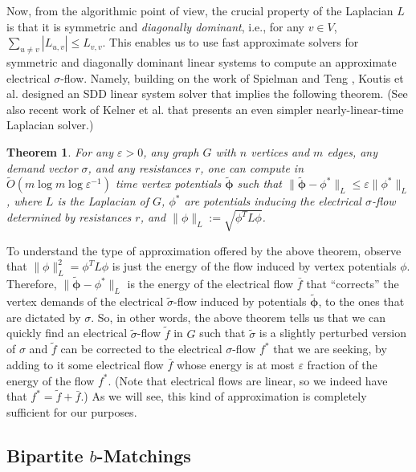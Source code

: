 \documentclass[11pt, letterpaper]{article}
\newtheorem{theorem}{Theorem}[section]
\newcommand{\tO}[1]{\widetilde{O}(#1)}
\newcommand{\eps}{\varepsilon}
\newcommand{\vphi}{\boldsymbol{\mathit{\phi}}}
\newcommand{\vsigma}{\boldsymbol{\mathit{\sigma}}}
\newcommand{\tvsigma}{\boldsymbol{\mathit{\tilde{\sigma}}}}
\newcommand{\tvphi}{\boldsymbol{\tilde{\phi}}}
\newcommand{\bb}{\boldsymbol{\mathit{b}}}
\newcommand{\ff}{\boldsymbol{\mathit{f}}}
\newcommand{\tff}{\boldsymbol{\mathit{\tilde{f}}}}
\newcommand{\off}{\boldsymbol{\mathit{\bar{f}}}}
\newcommand{\rr}{\boldsymbol{\mathit{r}}}
\newcommand{\LL}{\boldsymbol{\mathit{L}}}
\begin{document}
Now, from the algorithmic point of view, the crucial property of the Laplacian $\LL$ is that it is symmetric and {\em diagonally dominant}, i.e., for any $v\in V$, $\sum_{u\neq v} |L_{u,v}| \leq L_{v,v}$. This enables us to use fast approximate solvers for symmetric and diagonally dominant linear systems to compute an approximate electrical $\vsigma$-flow. Namely, building on the work of Spielman and Teng \cite{SpielmanT03,SpielmanTeng04}, Koutis et al. \cite{KoutisMP10,KoutisMP11} designed an SDD linear system solver that implies the following theorem. (See also recent work of Kelner et al. \cite{KelnerOSZ13} that presents an even simpler nearly-linear-time Laplacian solver.)


\begin{theorem}\label{thm:vanilla_SDD_solver}
For any $\eps>0$, any graph $G$ with $n$ vertices and $m$ edges, any demand vector $\vsigma$, and any resistances $\rr$, one can compute in $\tO{m \log m \log \eps^{-1}}$ time vertex potentials $\tvphi$ such that
$\|\tvphi-\vphi^*\|_{\LL}\leq \eps \|\vphi^*\|_{\LL}$, where $\LL$ is the Laplacian of $G$, $\vphi^*$ are potentials inducing the electrical $\vsigma$-flow determined by resistances $\rr$, and $\|\vphi\|_{\LL}:=\sqrt{\vphi^T \LL \vphi}$.
\end{theorem}

To understand the type of approximation offered by the above theorem, observe that $\|\vphi\|_{\LL}^2=\vphi^T\LL\vphi$ is just the energy of the flow induced by vertex potentials $\vphi$. Therefore, $\|\tvphi-\vphi^*\|_{\LL}$ is the energy of the electrical flow $\off$ that ``corrects'' the vertex demands of the electrical $\tvsigma$-flow induced by potentials $\tvphi$, to the ones that are dictated by $\vsigma$. So, in other words, the above theorem tells us that we can quickly find an electrical $\tvsigma$-flow $\tff$ in $G$ such that $\tvsigma$ is a slightly perturbed version of $\vsigma$ and $\tff$ can be corrected to the electrical $\vsigma$-flow $\ff^*$ that we are seeking, by adding to it some electrical flow $\off$ whose energy is at most $\eps$ fraction of the energy of the flow $\ff^*$. (Note that electrical flows are linear, so we indeed have that $\ff^*=\tff+\off$.) As we will see, this kind of approximation is completely sufficient for our purposes. 

\subsection{Bipartite \texorpdfstring{$\bb$-Matchings}{b-Matchings}}
\end{document}

